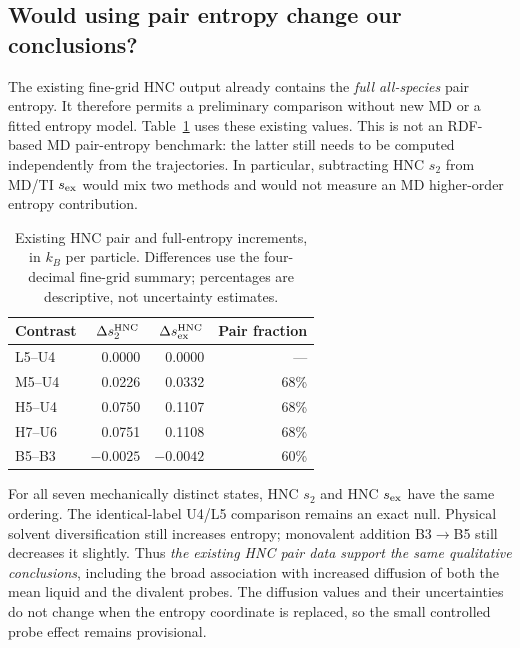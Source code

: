 \documentclass[11pt,a4paper]{article}
\begin{document}
\subsection{Would using pair entropy change our conclusions?}
\label{sec:ourPairEntropy}
The existing fine-grid HNC output already contains the \emph{full all-species}
pair entropy. It therefore permits a preliminary comparison without new MD
or a fitted entropy model. Table~\ref{tab:ourPairEntropy} uses these existing
values. This is not an RDF-based MD pair-entropy benchmark: the latter still
needs to be computed independently from the trajectories. In particular,
subtracting HNC $s_2$ from MD/TI $s_{\rm ex}$ would mix two methods and would
not measure an MD higher-order entropy contribution.

\begin{table}[ht]
\centering\small
\caption{Existing HNC pair and full-entropy increments, in $k_B$ per particle.
Differences use the four-decimal fine-grid summary; percentages are descriptive,
not uncertainty estimates.}
\label{tab:ourPairEntropy}
\begin{tabular}{@{}lrrr@{}}
\toprule
Contrast & $\Delta s_2^{\rm HNC}$ & $\Delta s_{\rm ex}^{\rm HNC}$ & Pair fraction\\
\midrule
L5--U4 & 0.0000 & 0.0000 & ---\\
M5--U4 & 0.0226 & 0.0332 & 68\%\\
H5--U4 & 0.0750 & 0.1107 & 68\%\\
H7--U6 & 0.0751 & 0.1108 & 68\%\\
B5--B3 & $-0.0025$ & $-0.0042$ & 60\%\\
\bottomrule
\end{tabular}
\end{table}

For all seven mechanically distinct states, HNC $s_2$ and HNC $s_{\rm ex}$
have the same ordering. The identical-label U4/L5 comparison remains an
exact null. Physical solvent diversification still increases entropy;
monovalent addition B3$\rightarrow$B5 still decreases it slightly. Thus
\emph{the existing HNC pair data support the same qualitative conclusions},
including the broad association with increased diffusion of both the mean
liquid and the divalent probes. The diffusion values and their uncertainties
do not change when the entropy coordinate is replaced, so the small
controlled probe effect remains provisional.
\end{document}
